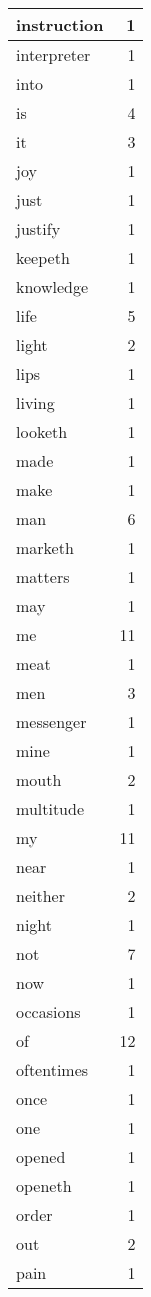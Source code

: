 \begin{center}
\begin{longtable}{l|r}
instruction & 1 \\ \hline
interpreter & 1 \\ \hline
into & 1 \\ \hline
is & 4 \\ \hline
it & 3 \\ \hline
joy & 1 \\ \hline
just & 1 \\ \hline
justify & 1 \\ \hline
keepeth & 1 \\ \hline
knowledge & 1 \\ \hline
life & 5 \\ \hline
light & 2 \\ \hline
lips & 1 \\ \hline
living & 1 \\ \hline
looketh & 1 \\ \hline
made & 1 \\ \hline
make & 1 \\ \hline
man & 6 \\ \hline
marketh & 1 \\ \hline
matters & 1 \\ \hline
may & 1 \\ \hline
me & 11 \\ \hline
meat & 1 \\ \hline
men & 3 \\ \hline
messenger & 1 \\ \hline
mine & 1 \\ \hline
mouth & 2 \\ \hline
multitude & 1 \\ \hline
my & 11 \\ \hline
near & 1 \\ \hline
neither & 2 \\ \hline
night & 1 \\ \hline
not & 7 \\ \hline
now & 1 \\ \hline
occasions & 1 \\ \hline
of & 12 \\ \hline
oftentimes & 1 \\ \hline
once & 1 \\ \hline
one & 1 \\ \hline
opened & 1 \\ \hline
openeth & 1 \\ \hline
order & 1 \\ \hline
out & 2 \\ \hline
pain & 1 \\ \hline

\end{longtable}
\end{center}
